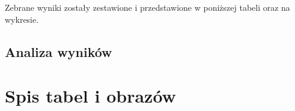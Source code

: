 \documentclass[a4paper, 11pt]{report}
\begin{document}
	Zebrane wyniki zostały zestawione i przedstawione w poniższej tabeli oraz na wykresie.
	

%	
	
	\section{Analiza wyników}	

\chapter{Spis tabel i obrazów}


\begingroup
\let\clearpage\relax
\listoffigures
\listoftables
\endgroup
\end{document}
